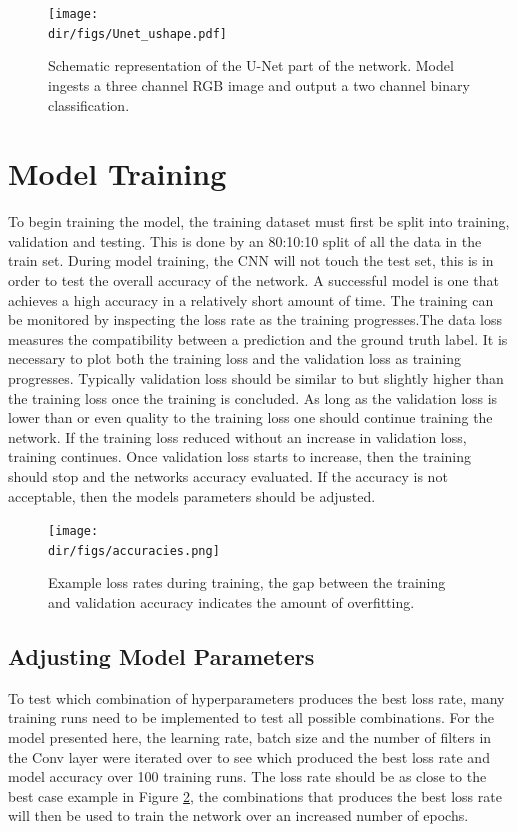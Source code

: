 \begin{figure}[htpb]
    \centering
    \texttt{[image: \\dir/figs/Unet\_ushape.pdf]}
    \caption[Schematic representation of the U-Net part of the network]{Schematic representation of the U-Net part of the network. Model ingests a three channel RGB image and output a two channel binary classification.}
    \label{fig.unet_large}
\end{figure}


\section{Model Training}\label{sec.model_training}
To begin training the model, the training dataset must first be split into training, validation and testing. This is done by an 80:10:10 split of all the data in the train set. During model training, the CNN will not touch the test set, this is in order to test the overall accuracy of the network. A successful model is one that achieves a high accuracy in a relatively short amount of time. The training can be monitored by inspecting the loss rate as the training progresses.The data loss measures the compatibility between a prediction and the ground truth label. It is necessary to plot both the training loss and the validation loss as training progresses. Typically validation loss should be similar to but slightly higher than the training loss once the training is concluded. As long as the validation loss is lower than or even quality to the training loss one should continue training the network. If the training loss reduced without an increase in validation loss, training continues. Once validation loss starts to increase, then the training should stop and the networks accuracy evaluated. If the accuracy is not acceptable, then the models parameters should be adjusted. 
\begin{figure}[htpb]
    \centering
    \texttt{[image: \\dir/figs/accuracies.png]}
    \caption[Example loss rates during training]{Example loss rates during training, the gap between the training and validation accuracy indicates the amount of overfitting.}
    \label{fig.accuracies}
\end{figure}
\subsection{Adjusting Model Parameters}
To test which combination of hyperparameters produces the best loss rate, many training runs need to be implemented to test all possible combinations. For the model presented here, the learning rate, batch size and the number of filters in the Conv layer were iterated over to see which produced the best loss rate and model accuracy over 100 training runs. The loss rate should be as close to the best case example in Figure \ref{fig.accuracies}, the combinations that produces the best loss rate will then be used to train the network over an increased number of epochs.
